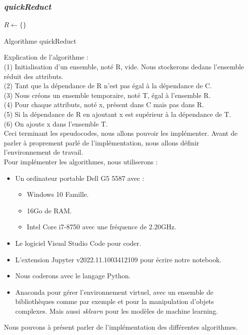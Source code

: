 \subsubsection{\textit{quickReduct}}
\begin{algorithm}[h!]
	\SetAlgoLined
	\LinesNumbered
	$R \gets \{\}$ \;
	\caption{Algorithme quickReduct}
\end{algorithm}
Explication de l'algorithme : \\
(1) Initialisation d'un ensemble, noté R, vide. Nous stockerons dedans
l'ensemble réduit des attributs. \\
(2) Tant que la dépendance de R n'est pas égal à la dépendance de C. \\
(3) Nous créons un ensemble temporaire, noté T, égal à l'ensemble R. \\
(4) Pour chaque attributs, noté x, présent dans C mais pas dans R. \\
(5) Si la dépendance de R en ajoutant x est supérieur à la dépendance de T. \\
(6) On ajoute x dans l'ensemble T. \\

Ceci terminant les speudocodes, nous allons pouvoir les implémenter.
Avant de parler à proprement parlé de l'implémentation, nous allons
définir l'environnement de travail. \\
Pour implémenter les algorithmes, nous utiliserons :
\begin{itemize}
	\item Un ordinateur portable Dell G5 5587 avec :
	      \begin{itemize}
		      \item Windows 10 Famille.
		      \item 16Go de RAM.
		      \item Intel Core i7-8750 avec une fréquence de 2.20GHz.
	      \end{itemize}
	\item Le logiciel Visual Studio Code pour coder.
	\item L'extension Jupyter v2022.11.1003412109 pour écrire
	      notre notebook.
	\item Nous coderons avec le langage Python.
	\item Anaconda pour gérer l'environnement virtuel, avec un ensemble
	      de bibliothèques comme par exemple \panda et \numpy
	      pour la manipulation d'objets complexes.
	      Mais aussi \textit{sklearn} pour les modèles de machine learning.
\end{itemize}
Nous pouvons à présent parler de l'implémentation des différentes
algorithmes.
